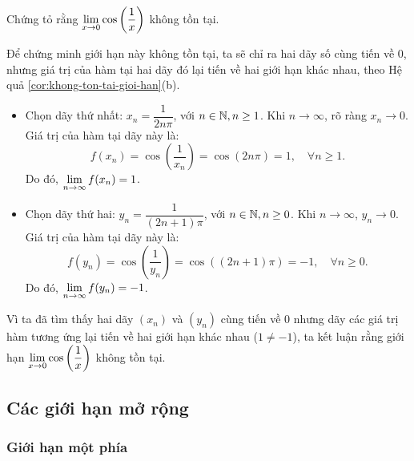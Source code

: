 \begin{example}
    Chứng tỏ rằng $\lim\limits_{x \to 0} \cos\left(\dfrac{1}{x}\right)$ không tồn tại.
\end{example}
\begin{solution}
    Để chứng minh giới hạn này không tồn tại, ta sẽ chỉ ra hai dãy số cùng tiến về 0, nhưng giá trị của hàm tại hai dãy đó lại tiến về hai giới hạn khác nhau, theo Hệ quả \ref{cor:khong-ton-tai-gioi-han}(b).
    
    \begin{itemize}
        \item Chọn dãy thứ nhất: $x_n = \dfrac{1}{2n\pi}$, với $n \in \mathbb{N}, n \ge 1$.
        Khi $n \to \infty$, rõ ràng $x_n \to 0$.
        Giá trị của hàm tại dãy này là:
        \begin{equation*}
            f(x_n) = \cos\left(\dfrac{1}{x_n}\right) = \cos(2n\pi) = 1, \quad \forall n \ge 1.
        \end{equation*}
        Do đó, $\lim\limits_{n \to \infty} f(x_n) = 1$.
        
        \item Chọn dãy thứ hai: $y_n = \dfrac{1}{(2n+1)\pi}$, với $n \in \mathbb{N}, n \ge 0$.
        Khi $n \to \infty$, $y_n \to 0$.
        Giá trị của hàm tại dãy này là:
        \begin{equation*}
            f(y_n) = \cos\left(\dfrac{1}{y_n}\right) = \cos((2n+1)\pi) = -1, \quad \forall n \ge 0.
        \end{equation*}
        Do đó, $\lim\limits_{n \to \infty} f(y_n) = -1$.
    \end{itemize}
    
    Vì ta đã tìm thấy hai dãy $(x_n)$ và $(y_n)$ cùng tiến về 0 nhưng dãy các giá trị hàm tương ứng lại tiến về hai giới hạn khác nhau ($1 \neq -1$), ta kết luận rằng giới hạn $\lim\limits_{x \to 0} \cos\left(\dfrac{1}{x}\right)$ không tồn tại.
\end{solution}


\subsection{Các giới hạn mở rộng}
\label{subsec:gioi-han-mo-rong}

\subsubsection{Giới hạn một phía}

